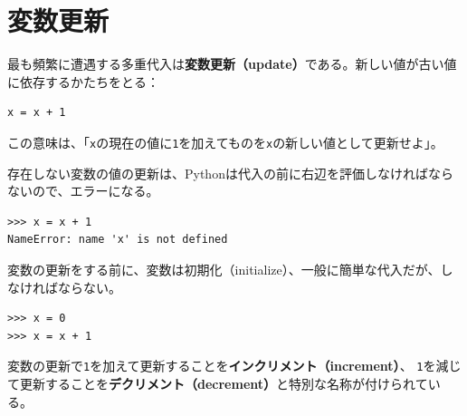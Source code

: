 \documentclass[a4j,12pt,makeidx]{jbook}
\begin{document}
\section{変数更新}
最も頻繁に遭遇する多重代入は{\bf 変数更新（update）}である。新しい値が古い値に依存するかたちをとる：
\begin{verbatim}
x = x + 1
\end{verbatim}
この意味は、「{\tt x}の現在の値に{\tt 1}を加えてものを{\tt x}の新しい値として更新せよ」。 \par
存在しない変数の値の更新は、Pythonは代入の前に右辺を評価しなければならないので、エラーになる。
\begin{verbatim}
>>> x = x + 1
NameError: name 'x' is not defined
\end{verbatim}
変数の更新をする前に、変数は初期化（initialize）、一般に簡単な代入だが、しなければならない。
\begin{verbatim}
>>> x = 0
>>> x = x + 1
\end{verbatim}
変数の更新で{\tt 1}を加えて更新することを{\bf インクリメント（increment）}、
{\tt 1}を減じて更新することを{\bf デクリメント（decrement）}と特別な名称が付けられている。
%
\end{document}
